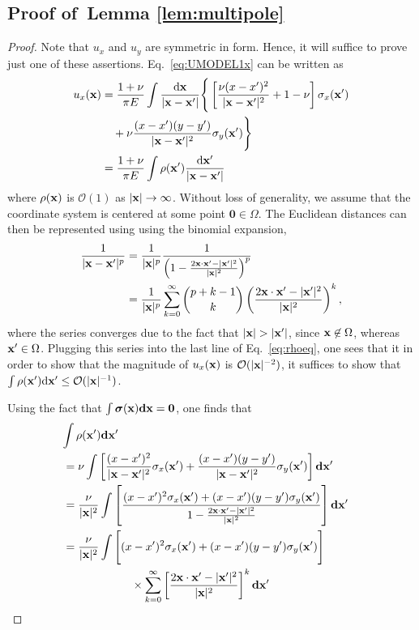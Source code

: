 \documentclass[aps,prl,reprint,twocolumn,groupedaddress,showpacs]{revtex4-1}
\newcommand{\bsigma}{{\boldsymbol\sigma}}
\def\d{{\bf d}}
\def\dd{\mbox{d}}
\def\x{{\bf x}}
\begin{document}
\subsection{Proof of~Lemma \ref{lem:multipole}}

\begin{proof}
Note that $u_x$ and $u_y$ are symmetric in form. Hence, it will suffice to prove just one of these assertions. Eq.~\ref{eq:UMODEL1x} can be written as
\begin{align}
u_x(\x) &= \frac{1+\nu}{\pi E} \int \frac{\dd \x}{|\x-\x'|} \Bigg\{ \left[ \frac{\nu(x - x')^2}{|\x-\x'|^2} + 1-\nu \right]\sigma_x(\x')  \nonumber\\
&\quad+\nu\frac{(x-x')(y-y')}{|\x-\x'|^2} \sigma_y(\x')  \Bigg\} \nonumber\\
&= \frac{1+\nu}{\pi E}   \int \rho(\x')    \frac{\dd \x'}{|\x-\x'|} \label{eq:rhoeq}
\end{align}
where $\rho(\x)$ is $\mathcal{O}(1)$ as $\vert\x\vert\to\infty$. Without loss of generality, we assume that the coordinate system is centered at some point $\mathbf{0}\in\Omega$. The Euclidean distances can then be represented using using the binomial expansion,
\begin{align}
\frac{1}{|\x-\x'|^p} &= \frac{1}{|\x|^p}\frac{1}{\left(1 - \frac{2\x\cdot\x' - |\x'|^2}{|\x|^2} \right)^p } \nonumber\\
&= \frac{1}{|\x|^p}\sum_{k=0}^\infty {{p+k-1}\choose{k}} \left(  \frac{2\x\cdot\x' - |\x'|^2}{|\x|^2} \right)^k,
\end{align} 
where the series converges due to the fact that $|\x| > |\x'|$, since $\x\not\in\Omega$, whereas $\x'\in\Omega$. Plugging this series into the last line of Eq.~\ref{eq:rhoeq}, one sees that it in order to show that the magnitude of $u_x(\x)$ is $\mathcal{O}(|\x|^{-2})$, it suffices to show that $\int \rho(\x')\dd\x' \leq \mathcal{O}(|\x|^{-1})$.

Using the fact that $\int \bsigma(\x)\d\x = \mathbf{0}$, one finds that
%
\begin{align}
\lefteqn{\int \rho(\x')\d\x' }\nonumber\\
&= \nu\int\left[ \frac{(x - x')^2}{|\x-\x'|^2} \sigma_x(\x') +  \frac{(x-x')(y-y')}{|\x-\x'|^2} \sigma_y(\x')  \right]\d\x' \nonumber\\
&=\frac{\nu}{|\x|^2}\int\left[ \frac{(x - x')^2\sigma_x(\x')  + (x-x')(y-y')\sigma_y(\x') }{1- \frac{2\x\cdot\x' - |\x'|^2}{|\x|^2}} \right]\d\x' \nonumber\\
&= \frac{\nu}{|\x|^2}\int\Bigg[  (x - x')^2\sigma_x(\x')  + (x-x')(y-y')\sigma_y(\x')  \Bigg] \nonumber\\
&\qquad\qquad\qquad\times\sum_{k=0}^\infty \left[  \frac{2\x\cdot\x' - |\x'|^2}{|\x|^2} \right]^k \d\x'
\end{align}


\end{proof}
\end{document}
